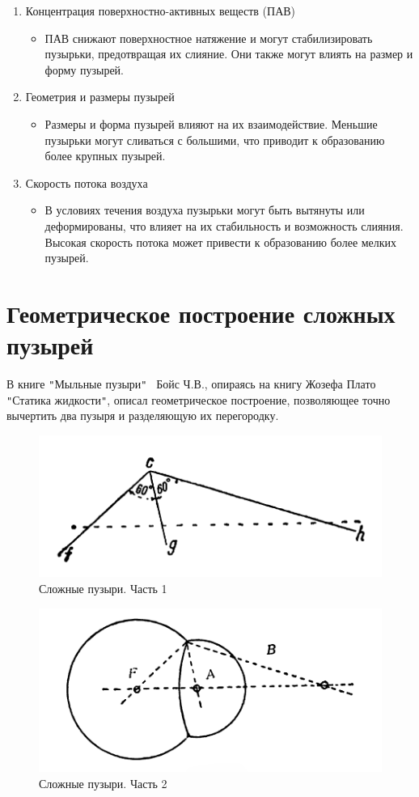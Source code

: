 \begin{enumerate}[label={\arabic*)}]
	\item Концентрация поверхностно-активных веществ (ПАВ)
	\begin{itemize}	
		\item ПАВ снижают поверхностное натяжение и могут стабилизировать пузырьки, предотвращая их слияние. Они также могут влиять на размер и форму пузырей.
	\end{itemize}
	\item Геометрия и размеры пузырей
	\begin{itemize}	
		\item Размеры и форма пузырей влияют на их взаимодействие. Меньшие пузырьки могут сливаться с большими, что приводит к образованию более крупных пузырей.
	\end{itemize}	
	\item Скорость потока воздуха
	\begin{itemize}	
		\item В условиях течения воздуха пузырьки могут быть вытянуты или деформированы, что влияет на их стабильность и возможность слияния. Высокая скорость потока может привести к образованию более мелких пузырей.
	\end{itemize}	
\end{enumerate}

\section{Геометрическое построение сложных пузырей}

В книге \verb|"|Мыльные пузыри\verb|"|~\cite{boys} Бойс Ч.В., опираясь на книгу Жозефа Плато \verb|"|Статика жидкости\verb|"|, описал геометрическое построение, позволяющее точно вычертить два пузыря и разделяющую их перегородку.

\begin{figure}[h]
	\centering
	\includegraphics[width=0.5\linewidth]{pictures/drawing_cluster_1.png}
	\caption{Сложные пузыри. Часть 1}
	\label{fig:drawing_cluster_1}
\end{figure}
\begin{figure}[h]
	\centering
	\includegraphics[width=0.7\linewidth]{pictures/drawing_cluster_2.png}
	\caption{Сложные пузыри. Часть 2}
	\label{fig:drawing_cluster_2}
\end{figure}

